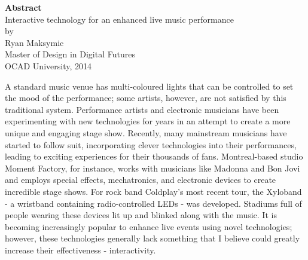\begin{center}
{\large\textbf{Abstract}}\\[0.5cm]
Interactive technology for an enhanced live music performance\\[0.25cm]
by\\[0.25cm]
Ryan Maksymic\\
Master of Design in Digital Futures\\
OCAD University, 2014\\[0.5cm]
\end{center}

A standard music venue has multi-coloured lights that can be controlled to set the mood of the performance; some artists, however, are not satisfied by this traditional system. Performance artists and electronic musicians have been experimenting with new technologies for years in an attempt to create a more unique and engaging stage show. Recently, many mainstream musicians have started to follow suit, incorporating clever technologies into their performances, leading to exciting experiences for their thousands of fans. Montreal-based studio Moment Factory, for instance, works with musicians like Madonna and Bon Jovi and employs special effects, mechatronics, and electronic devices to create incredible stage shows. For rock band Coldplay's most recent tour, the Xyloband - a wristband containing radio-controlled LEDs - was developed. Stadiums full of people wearing these devices lit up and blinked along with the music. It is becoming increasingly popular to enhance live events using novel technologies; however, these technologies generally lack something that I believe could greatly increase their effectiveness - interactivity.